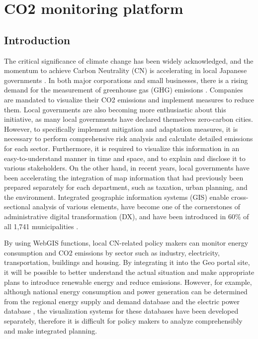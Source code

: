 \chapter{CO2 monitoring platform}
\renewcommand{\headrulewidth}{0pt}
\lhead[\thepage]{\leftmark}
\rhead[\leftmark]{\thepage}
\cfoot[]{}

\section{Introduction}
The critical significance of climate change has been widely acknowledged, and the momentum to achieve Carbon Neutrality (CN) is accelerating in local Japanese governments \citep{nakazawa2023net}. In both major corporations and small businesses, there is a rising demand for the measurement of greenhouse gas (GHG) emissions \citep{kauffmann2012corporate}. Companies are mandated to visualize their CO2 emissions and implement measures to reduce them. Local governments are also becoming more enthusiastic about this initiative, as many local governments have declared themselves zero-carbon cities. However, to specifically implement mitigation and adaptation measures, it is necessary to perform comprehensive risk analysis and calculate detailed emissions for each sector. Furthermore, it is required to visualize this information in an easy-to-understand manner in time and space, and to explain and disclose it to various stakeholders. On the other hand, in recent years, local governments have been accelerating the integration of map information that had previously been prepared separately for each department, such as taxation, urban planning, and the environment. Integrated geographic information systems (GIS) enable cross-sectional analysis of various elements, have become one of the cornerstones of administrative digital transformation (DX), and have been introduced in 60\% of all 1,741 municipalities \citep{nikkei}.\par

By using WebGIS functions, local CN-related policy makers can monitor energy consumption and CO2 emissions by sector such as industry, electricity, transportation, buildings and housing. By integrating it into the Geo portal site, it will be possible to better understand the actual situation and make appropriate plans to introduce renewable energy and reduce emissions. However, for example, although national energy consumption and power generation can be determined from the regional energy supply and demand database \citep{Toshihiko} and the electric power database \citep{kitamoto, nlftp}, the visualization systems for these databases have been developed separately, therefore it is difficult for policy makers to analyze comprehensibly and make integrated planning.\par


